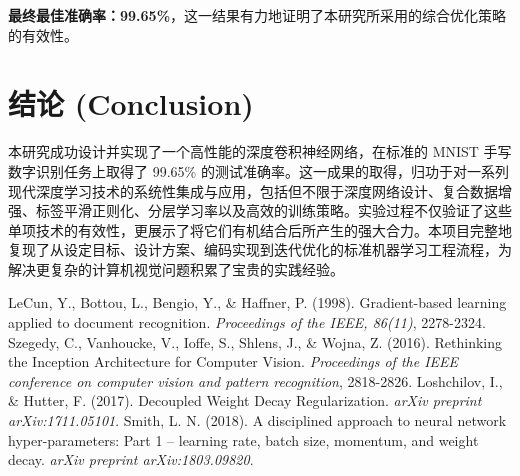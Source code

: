\documentclass[UTF8]{ctexart}
\begin{document}
\textbf{最终最佳准确率：99.65\%}，这一结果有力地证明了本研究所采用的综合优化策略的有效性。

\section{结论 (Conclusion)}

本研究成功设计并实现了一个高性能的深度卷积神经网络，在标准的 MNIST 手写数字识别任务上取得了 99.65\% 的测试准确率。这一成果的取得，归功于对一系列现代深度学习技术的系统性集成与应用，包括但不限于深度网络设计、复合数据增强、标签平滑正则化、分层学习率以及高效的训练策略。实验过程不仅验证了这些单项技术的有效性，更展示了将它们有机结合后所产生的强大合力。本项目完整地复现了从设定目标、设计方案、编码实现到迭代优化的标准机器学习工程流程，为解决更复杂的计算机视觉问题积累了宝贵的实践经验。

\begin{thebibliography}{9}
     LeCun, Y., Bottou, L., Bengio, Y., \& Haffner, P. (1998). Gradient-based learning applied to document recognition. \textit{Proceedings of the IEEE, 86(11)}, 2278-2324.
     Szegedy, C., Vanhoucke, V., Ioffe, S., Shlens, J., \& Wojna, Z. (2016). Rethinking the Inception Architecture for Computer Vision. \textit{Proceedings of the IEEE conference on computer vision and pattern recognition}, 2818-2826.
     Loshchilov, I., \& Hutter, F. (2017). Decoupled Weight Decay Regularization. \textit{arXiv preprint arXiv:1711.05101}.
     Smith, L. N. (2018). A disciplined approach to neural network hyper-parameters: Part 1 -- learning rate, batch size, momentum, and weight decay. \textit{arXiv preprint arXiv:1803.09820}.
\end{thebibliography}
\end{document}
